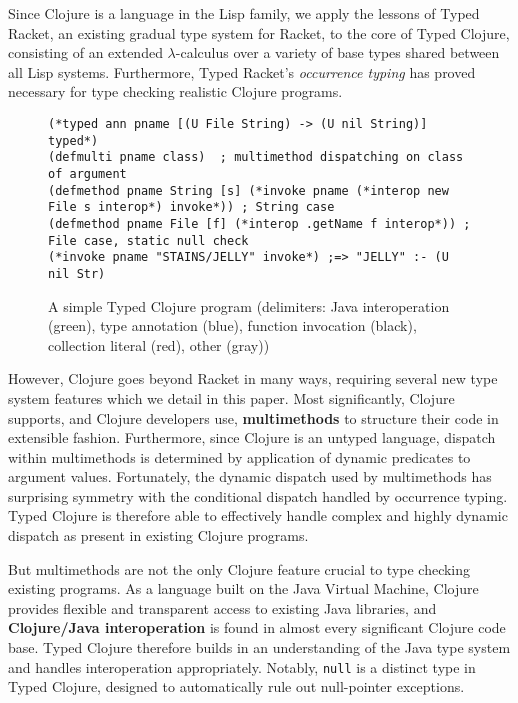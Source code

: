 Since Clojure is a language in the
Lisp family, we apply the lessons of Typed Racket, an existing gradual type
system for Racket, to the core of Typed Clojure, consisting of an extended
$\lambda$-calculus over a variety of base types shared between all Lisp systems.
%
Furthermore, Typed Racket's \emph{occurrence typing} has proved
necessary for type checking realistic Clojure programs.

\begin{figure*}[t!]
  \normalsize
\begin{lstlisting}
(*typed ann pname [(U File String) -> (U nil String)] typed*)
(defmulti pname class)  ; multimethod dispatching on class of argument
(defmethod pname String [s] (*invoke pname (*interop new File s interop*) invoke*)) ; String case 
(defmethod pname File [f] (*interop .getName f interop*)) ; File case, static null check
(*invoke pname "STAINS/JELLY" invoke*) ;=> "JELLY" :- (U nil Str)
\end{lstlisting}
\caption{A simple Typed Clojure program (delimiters: {\color{interop}Java interoperation (green)}, 
  {\color{types}type annotation (blue)},
  {\color{invoke}function invocation (black)}, {\color{red}collection literal (red)}, {\color{mygray}other (gray)})}
\label{fig:ex1}
\end{figure*}


However, Clojure goes beyond Racket in many ways, requiring several
new type system features which we detail in this paper.
%
Most significantly, Clojure supports, and Clojure developers use,
\textbf{multimethods} to structure their code in extensible
fashion. Furthermore, since Clojure is an untyped language, dispatch
within multimethods is determined by application of dynamic predicates
to argument values. 
%
Fortunately, the dynamic dispatch used by multimethods has surprising
symmetry with the conditional dispatch handled by occurrence
typing. Typed Clojure is therefore able to effectively handle complex
and highly dynamic dispatch as present in existing Clojure programs. 

But multimethods are not the only Clojure feature crucial to type
checking existing programs. As a language built on the Java Virtual
Machine, Clojure provides flexible and transparent access to existing
Java libraries, and \textbf{Clojure/Java interoperation} is found in almost
every significant Clojure code base. Typed Clojure therefore builds in
an understanding of the Java type system and handles interoperation
appropriately. Notably, \texttt{null} is a distinct type in Typed Clojure,
designed to automatically rule out null-pointer exceptions.

